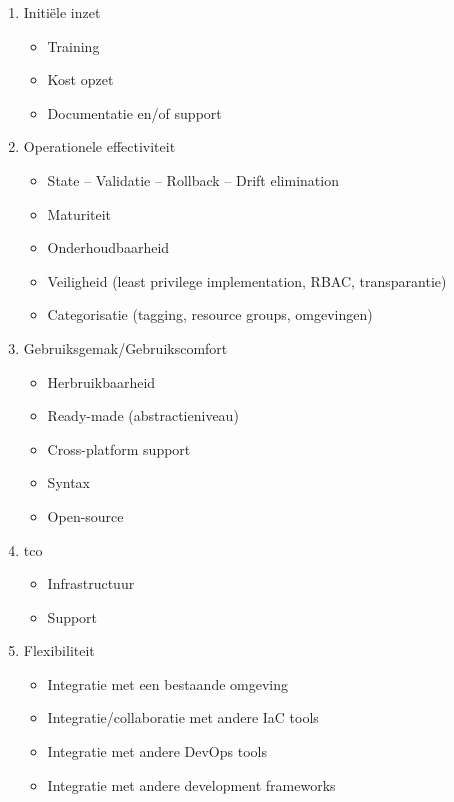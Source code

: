 \begin{enumerate}
    \item Initiële inzet
    \begin{itemize}
        \item Training
        \item Kost opzet
        \item Documentatie en/of support
    \end{itemize}
    \item Operationele effectiviteit
    \begin{itemize}
        \item State – Validatie – Rollback – Drift elimination %
        \item Maturiteit
        \item Onderhoudbaarheid
        \item Veiligheid (least privilege implementation, RBAC, transparantie)
        \item Categorisatie (tagging, resource groups, omgevingen)
    \end{itemize}
    \item Gebruiksgemak/Gebruikscomfort
    \begin{itemize}
        \item Herbruikbaarheid
        \item Ready-made (abstractieniveau)
        \item Cross-platform support
        \item Syntax
        \item Open-source
    \end{itemize}
    \item \acrfull{tco}
    \begin{itemize}
        \item Infrastructuur
        \item Support
    \end{itemize}
    \item Flexibiliteit
    \begin{itemize}
        \item Integratie met een bestaande omgeving
        \item Integratie/collaboratie met andere IaC tools
        \item Integratie met andere DevOps tools
        \item Integratie met andere development frameworks
    \end{itemize}
\end{enumerate}

